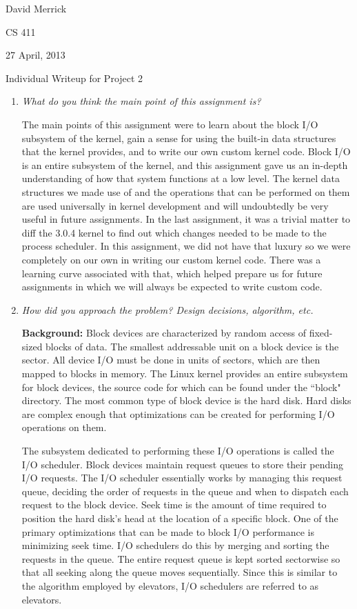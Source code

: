 \documentclass[letterpaper,10pt,titlepage]{article}
\newcommand{\ignore}[2]{\hspace{0in}#2} %
\newcommand{\tab}{\hspace*{2em}} %
\def\name{David Merrick}
\begin{document}
\name

CS 411

27 April, 2013

\begin{center}
{\LARGE Individual Writeup for Project 2}
\end{center}

\begin{enumerate} 
\item \emph{What do you think the main point of this assignment is?}

\tab The main points of this assignment were to learn about the block I/O subsystem of the kernel, gain a sense for using the built-in data structures that the kernel provides, and to write our own custom kernel code. Block I/O is an entire subsystem of the kernel, and this assignment gave us an in-depth understanding of how that system functions at a low level. The kernel data structures we made use of and the operations that can be performed on them are used universally in kernel development and will undoubtedly be very useful in future assignments. In the last assignment, it was a trivial matter to diff the 3.0.4 kernel to find out which changes needed to be made to the process scheduler. In this assignment, we did not have that luxury so we were completely on our own in writing our custom kernel code. There was a learning curve associated with that, which helped prepare us for future assignments in which we will always be expected to write custom code.

\item \emph{How did you approach the problem? Design decisions, algorithm, etc.}

\tab \textbf{Background:} Block devices are characterized by random access of fixed-sized blocks of data. The smallest addressable unit on a block device is the sector. All device I/O must be done in units of sectors, which are then mapped to blocks in memory\ignore{[Source: Book pg. 289-290]}. The Linux kernel provides an entire subsystem for block devices, the source code for which can be found under the ``block" directory. The most common type of block device is the hard disk. Hard disks are complex enough that optimizations can be created for performing I/O operations on them. 

\tab The subsystem dedicated to performing these I/O operations is called the I/O scheduler. Block devices maintain request queues to store their pending I/O requests\ignore{[Source: Book pg. 297]}. The I/O scheduler essentially works by managing this request queue, deciding the order of requests in the queue and when to dispatch each request to the block device. Seek time is the amount of time required to position the hard disk's head at the location of a specific block. One of the primary optimizations that can be made to block I/O performance is minimizing seek time. I/O schedulers do this by merging and sorting the requests in the queue. The entire request queue is kept sorted sectorwise so that all seeking along the queue moves sequentially. Since this is similar to the algorithm employed by elevators, I/O schedulers are referred to as elevators\ignore{[Source: Book pg. 298-299]}. 


\end{enumerate}
\end{document}
